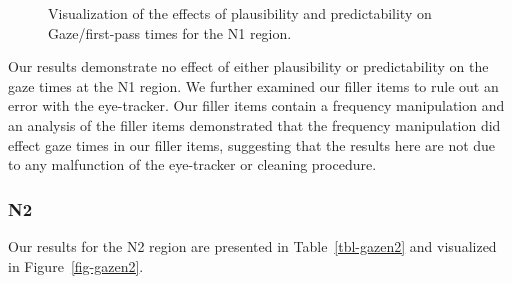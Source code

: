 \documentclass[
  letterpaper,
  DIV=11,
  numbers=noendperiod,
  nottoc,
  oneside]{scrreprt}
\begin{document}
\begin{figure}


\caption{\label{fig-gazen1}Visualization of the effects of plausibility
and predictability on Gaze/first-pass times for the N1 region.}

\end{figure}%

Our results demonstrate no effect of either plausibility or
predictability on the gaze times at the N1 region. We further examined
our filler items to rule out an error with the eye-tracker. Our filler
items contain a frequency manipulation and an analysis of the filler
items demonstrated that the frequency manipulation did effect gaze times
in our filler items, suggesting that the results here are not due to any
malfunction of the eye-tracker or cleaning procedure.

\subsubsection{N2}\label{n2-1}

Our results for the N2 region are presented in Table~\ref{tbl-gazen2}
and visualized in Figure~\ref{fig-gazen2}.
\end{document}
